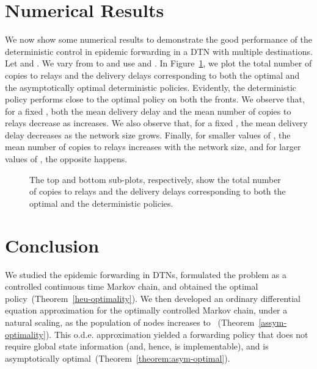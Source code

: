 \documentclass[10pt,journal,letterpaper]{IEEEtran}
\begin{document}
\section{Numerical Results}
\label{num-results}
We now show some numerical results to demonstrate the good performance of the deterministic control
in epidemic forwarding in a DTN with multiple destinations.
Let  and .
We vary  from  to  and use  and .
In Figure~\ref{fig:numerical}, we plot the total number of copies to relays and the delivery delays corresponding
to both the optimal and the  asymptotically optimal deterministic policies.
Evidently, the deterministic policy
performs close to the optimal policy on both the fronts.
We observe that, for a fixed , both the mean delivery delay and the
 mean number of copies to relays decrease as  increases.
We also observe that, for a fixed , the mean delivery delay decreases
as the network size grows.
Finally, for smaller values of , the mean number of copies to relays
increases  with the network size, and for larger values of , the opposite happens.
\begin{figure}[t]
\centering
{}
\caption{The top and bottom sub-plots, respectively, show the total
number of copies to relays and the delivery delays corresponding to
both the optimal and the deterministic policies.}
\label{fig:numerical}
\end{figure}

\section{Conclusion}
We studied the epidemic forwarding in DTNs, formulated the problem as a controlled continuous time Markov chain, and
obtained the optimal policy~(Theorem~\ref{heu-optimality}). We then developed an ordinary differential equation
approximation for the optimally controlled Markov chain, under a natural scaling, as the population of nodes
increases to ~(Theorem~\ref{assym-optimality}). This o.d.e. approximation yielded a forwarding policy that does not require
global state information (and, hence, is implementable), and is asymptotically optimal~(Theorem~\ref{theorem:asym-optimal}).
\end{document}
